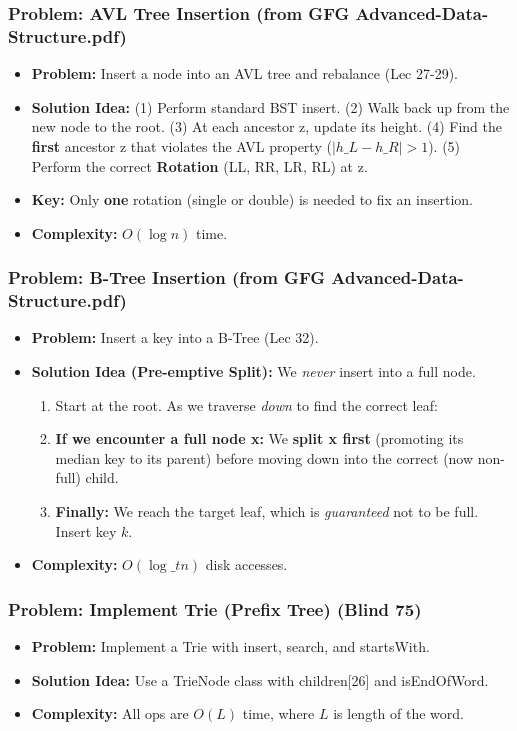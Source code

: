 \subsubsection{Problem: AVL Tree Insertion (from GFG Advanced-Data-Structure.pdf)}
\begin{itemize}
\item \textbf{Problem:} Insert a node into an AVL tree and rebalance (Lec 27-29).
\item \textbf{Solution Idea:} (1) Perform standard BST insert. (2) Walk back up from the new node to the root. (3) At each ancestor z, update its height. (4) Find the \textbf{first} ancestor z that violates the AVL property ($|h\_L - h\_R| > 1$). (5) Perform the correct \textbf{Rotation} (LL, RR, LR, RL) at z.
\item \textbf{Key:} Only \textbf{one} rotation (single or double) is needed to fix an insertion.
\item \textbf{Complexity:} $O(\log n)$ time.
\end{itemize}

\subsubsection{Problem: B-Tree Insertion (from GFG Advanced-Data-Structure.pdf)}
\begin{itemize}
\item \textbf{Problem:} Insert a key into a B-Tree (Lec 32).
\item \textbf{Solution Idea (Pre-emptive Split):} We \textit{never} insert into a full node.
\begin{enumerate}
\item Start at the root. As we traverse \textit{down} to find the correct leaf:
\item \textbf{If we encounter a full node x:} We \textbf{split x first} (promoting its median key to its parent) before moving down into the correct (now non-full) child.
\item \textbf{Finally:} We reach the target leaf, which is \textit{guaranteed} not to be full. Insert key $k$.
\end{enumerate}
\item \textbf{Complexity:} $O(\log\_t n)$ disk accesses.
\end{itemize}

\subsubsection{Problem: Implement Trie (Prefix Tree) (Blind 75)}
\begin{itemize}
\item \textbf{Problem:} Implement a Trie with insert, search, and startsWith.
\item \textbf{Solution Idea:} Use a TrieNode class with children[26] and isEndOfWord.
\item \textbf{Complexity:} All ops are $O(L)$ time, where $L$ is length of the word.
\end{itemize}

